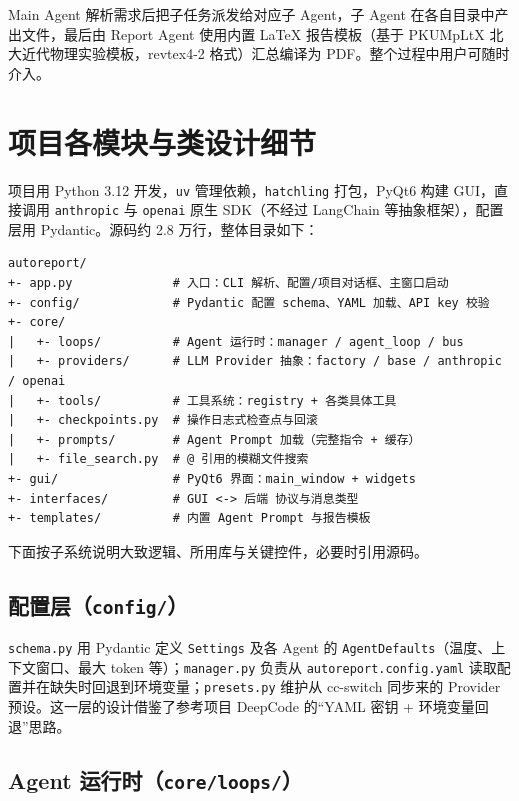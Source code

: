 \documentclass[a4paper,11pt]{article}
\begin{document}
Main Agent 解析需求后把子任务派发给对应子 Agent，子 Agent 在各自目录中产出文件，最后由 Report Agent 使用内置 LaTeX 报告模板（基于 PKUMpLtX\cite{pkumplt} 北大近代物理实验模板，revtex4-2 格式）汇总编译为 PDF。整个过程中用户可随时介入。

\section{项目各模块与类设计细节}

项目用 Python 3.12 开发，\texttt{uv} 管理依赖，\texttt{hatchling} 打包，PyQt6 构建 GUI，直接调用 \texttt{anthropic} 与 \texttt{openai} 原生 SDK（不经过 LangChain 等抽象框架），配置层用 Pydantic。源码约 2.8 万行，整体目录如下：

\begin{lstlisting}[language={},basicstyle=\ttfamily\footnotesize]
autoreport/
+- app.py              # 入口：CLI 解析、配置/项目对话框、主窗口启动
+- config/             # Pydantic 配置 schema、YAML 加载、API key 校验
+- core/
|   +- loops/          # Agent 运行时：manager / agent_loop / bus
|   +- providers/      # LLM Provider 抽象：factory / base / anthropic / openai
|   +- tools/          # 工具系统：registry + 各类具体工具
|   +- checkpoints.py  # 操作日志式检查点与回滚
|   +- prompts/        # Agent Prompt 加载（完整指令 + 缓存）
|   +- file_search.py  # @ 引用的模糊文件搜索
+- gui/                # PyQt6 界面：main_window + widgets
+- interfaces/         # GUI <-> 后端 协议与消息类型
+- templates/          # 内置 Agent Prompt 与报告模板
\end{lstlisting}

下面按子系统说明大致逻辑、所用库与关键控件，必要时引用源码。

\subsection{配置层（\texttt{config/}）}

\texttt{schema.py} 用 Pydantic 定义 \texttt{Settings} 及各 Agent 的 \texttt{AgentDefaults}（温度、上下文窗口、最大 token 等）；\texttt{manager.py} 负责从 \texttt{autoreport.config.yaml} 读取配置并在缺失时回退到环境变量；\texttt{presets.py} 维护从 cc-switch 同步来的 Provider 预设。这一层的设计借鉴了参考项目 DeepCode\cite{deepcode} 的“YAML 密钥 + 环境变量回退”思路。

\subsection{Agent 运行时（\texttt{core/loops/}）}
\end{document}
